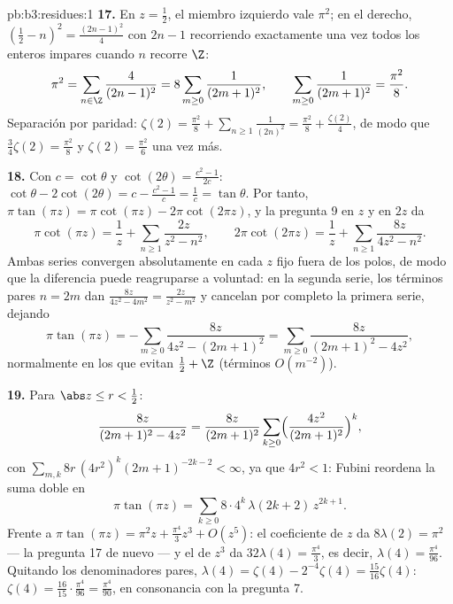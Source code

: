 \begin{solution}{pb:b3:residues:1}
\textbf{17.} En $z = \frac12$, el miembro izquierdo vale $\pi^2$; en el
derecho, $(\frac12 - n)^2 = \frac{(2n-1)^2}4$ con $2n -
1$ recorriendo exactamente una vez todos los enteros impares cuando $n$
recorre $\Z$:
\[
\pi^2 = \sum_{n\in\Z}\frac{4}{(2n-1)^2}
= 8\sum_{m\geq0}\frac1{(2m+1)^2},
\qquad
\sum_{m\geq0}\frac1{(2m+1)^2} = \frac{\pi^2}8 .
\]
Separación por paridad: $\zeta(2) = \frac{\pi^2}8 +
\sum_{n\geq1}\frac1{(2n)^2} = \frac{\pi^2}8 +
\frac{\zeta(2)}4$, de modo que $\frac34\zeta(2) = \frac{\pi^2}8$ y
$\zeta(2) = \frac{\pi^2}6$ una vez más.

\textbf{18.} Con $c = \cot\theta$ y $\cot(2\theta) =
\frac{c^2-1}{2c}$: $\cot\theta - 2\cot(2\theta) = c -
\frac{c^2-1}c = \frac1c = \tan\theta$. Por tanto, $\pi\tan(\pi z)
= \pi\cot(\pi z) - 2\pi\cot(2\pi z)$, y la pregunta 9 en $z$ y en $2z$
da
\[
\pi\cot(\pi z) = \frac1z +
\sum_{n\geq1}\frac{2z}{z^2 - n^2},
\qquad
2\pi\cot(2\pi z) = \frac1z +
\sum_{n\geq1}\frac{8z}{4z^2 - n^2} .
\]
Ambas series convergen absolutamente en cada $z$ fijo fuera de los
polos, de modo que la diferencia puede reagruparse a voluntad: en la
segunda serie, los términos pares $n = 2m$ dan $\frac{8z}{4z^2 -
4m^2} = \frac{2z}{z^2 - m^2}$ y cancelan por completo la primera serie,
dejando
\[
\pi\tan(\pi z) = -\sum_{m\geq0}\frac{8z}{4z^2 - (2m+1)^2}
= \sum_{m\geq0}\frac{8z}{(2m+1)^2 - 4z^2} ,
\]
normalmente en los  que
evitan $\frac12 + \Z$ (términos
$O(m^{-2})$).

\textbf{19.} Para $\abs z \leq r < \frac12$:
\[
\frac{8z}{(2m+1)^2 - 4z^2} = \frac{8z}{(2m+1)^2}
\sum_{k\geq0}\Bigl(\frac{4z^2}{(2m+1)^2}\Bigr)^{k},
\]
con $\sum_{m,k}8r\,(4r^2)^k(2m+1)^{-2k-2} < \infty$, ya que $4r^2 < 1$:
Fubini reordena la suma doble en
\[
\pi\tan(\pi z) =
\sum_{k\geq0}8\cdot4^k\,\lambda(2k+2)\,z^{2k+1} .
\]
Frente a $\pi\tan(\pi z) = \pi^2z + \frac{\pi^4}3z^3 +
O(z^5)$: el coeficiente de $z$ da $8\lambda(2) = \pi^2$ --- la pregunta
17 de nuevo --- y el de $z^3$ da $32\lambda(4) = \frac{\pi^4}3$, es
decir, $\lambda(4) =
\frac{\pi^4}{96}$. Quitando los denominadores pares,
$\lambda(4) = \zeta(4) - 2^{-4}\zeta(4) =
\frac{15}{16}\zeta(4)$: $\zeta(4) = \frac{16}{15}\cdot
\frac{\pi^4}{96} = \frac{\pi^4}{90}$, en consonancia con la pregunta 7.


\end{solution}
